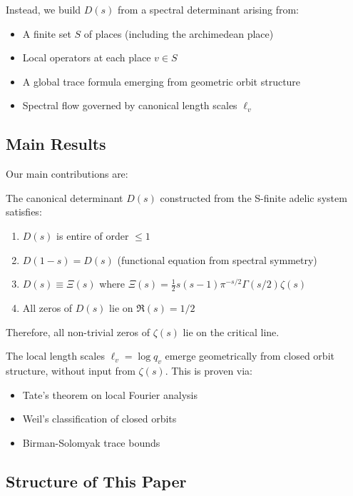 Instead, we build $D(s)$ from a spectral determinant arising from:
\begin{itemize}
\item A finite set $S$ of places (including the archimedean place)
\item Local operators at each place $v \in S$
\item A global trace formula emerging from geometric orbit structure
\item Spectral flow governed by canonical length scales $\ell_v$
\end{itemize}

\subsection{Main Results}

Our main contributions are:

\begin{theorem}
\label{thm:main_rh}
The canonical determinant $D(s)$ constructed from the S-finite adelic system satisfies:
\begin{enumerate}
\item $D(s)$ is entire of order $\leq 1$
\item $D(1-s) = D(s)$ (functional equation from spectral symmetry)
\item $D(s) \equiv \Xi(s)$ where $\Xi(s) = \frac{1}{2}s(s-1)\pi^{-s/2}\Gamma(s/2)\zeta(s)$
\item All zeros of $D(s)$ lie on $\Re(s) = 1/2$
\end{enumerate}
Therefore, all non-trivial zeros of $\zeta(s)$ lie on the critical line.
\end{theorem}

\begin{theorem}
\label{thm:local_lengths}
The local length scales $\ell_v = \log q_v$ emerge geometrically from closed orbit structure, without input from $\zeta(s)$. This is proven via:
\begin{itemize}
\item Tate's theorem on local Fourier analysis
\item Weil's classification of closed orbits
\item Birman-Solomyak trace bounds
\end{itemize}
\end{theorem}

\subsection{Structure of This Paper}


